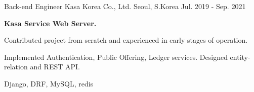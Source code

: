

\begin{cventries}
  \cventry
  {Back-end Engineer} %
  {Kasa Korea Co., Ltd.} %
  {Seoul, S.Korea} %
  {Jul. 2019 - Sep. 2021} %
  {
      \begin{cvitems} %
        \item[] {\textbf{Kasa Service Web Server.}}
        \item {Contributed project from scratch and experienced in early stages of operation.}
        \item {Implemented Authentication, Public Offering, Ledger services. Designed entity-relation and REST API.}
        \item {Django, DRF, MySQL, redis}
      \end{cvitems}
    }


\end{cventries}
